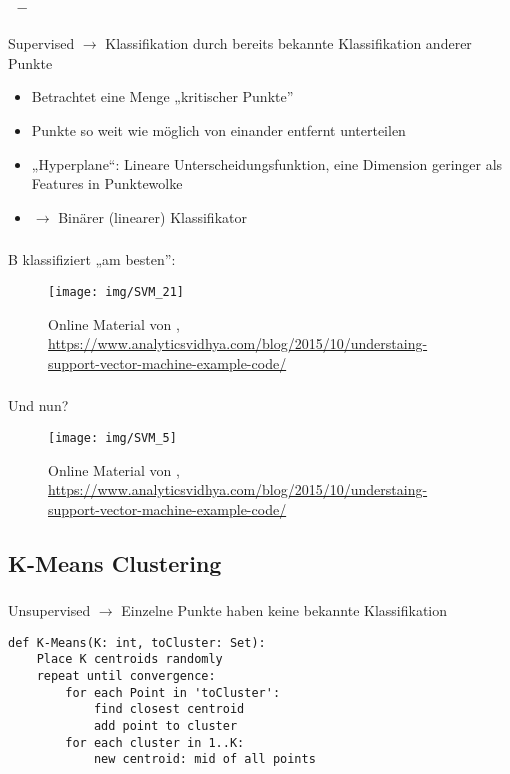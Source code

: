 \begin{frame}
    \frametitle{\insertsubsection \ -- \cite{datamining2011}}
    Supervised $\rightarrow$ Klassifikation durch bereits bekannte Klassifikation anderer Punkte 
    \vspace{1em}
    \begin{itemize}
        \setlength\itemsep{0.8em}
        \item Betrachtet eine Menge „kritischer Punkte”
        \item Punkte so weit wie möglich von einander entfernt unterteilen
        \item „Hyperplane“: Lineare Unterscheidungsfunktion, eine Dimension geringer als Features in Punktewolke
        \item $\rightarrow$ Binärer (linearer) Klassifikator
    \end{itemize}
\end{frame}

\begin{frame}
    \frametitle{\insertsubsection}
     B klassifiziert „am besten”:
    \begin{figure}[H]
        \centering
        \texttt{[image: img/SVM\_21]}
        \caption{Online Material von \cite{ray2015}, \url{https://www.analyticsvidhya.com/blog/2015/10/understaing-support-vector-machine-example-code/}\label{fig:svm}}
    \end{figure}
\end{frame}

\begin{frame}
    \frametitle{\insertsubsection}
    Und nun?
    \begin{figure}[H]
        \centering
        \texttt{[image: img/SVM\_5]}
        \caption{Online Material von \cite{ray2015}, \url{https://www.analyticsvidhya.com/blog/2015/10/understaing-support-vector-machine-example-code/}\label{fig:svm2}}
    \end{figure}
\end{frame}

\subsection{K-Means Clustering}

\begin{frame}[fragile]
    \frametitle{\insertsubsection}
    Unsupervised $\rightarrow$ Einzelne Punkte haben keine bekannte Klassifikation \cite{datamining2011}
    \vspace{1em}
    \begin{lstlisting}
def K-Means(K: int, toCluster: Set):
    Place K centroids randomly
    repeat until convergence:
        for each Point in 'toCluster':
            find closest centroid
            add point to cluster
        for each cluster in 1..K:
            new centroid: mid of all points
    \end{lstlisting}
    \cite{lavrenko2013}
\end{frame}

